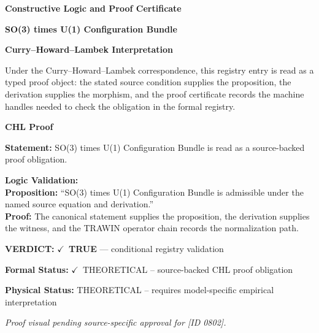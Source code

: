 \clearpage
\begingroup\tzpsupportsetup
\noindent\textbf{\fontsize{10.8pt}{12.8pt}\selectfont [ID 0802] Constructive Logic and Proof Certificate}\par
\noindent\textbf{\fontsize{10pt}{12pt}\selectfont SO(3) times U(1) Configuration Bundle}\par
\vspace{0.45em}
\begingroup
\footnotesize
\setlength{\parskip}{0.22em}
\setlength{\parindent}{0pt}
\noindent\textbf{Curry--Howard--Lambek Interpretation}\par
Under the Curry--Howard--Lambek correspondence, this registry entry is read as a typed proof
object: the stated source condition supplies the proposition, the derivation supplies the
morphism, and the proof certificate records the machine handles needed to check the obligation
in the formal registry.

\vspace{0.45em}
\noindent\textbf{CHL Proof}\par
\textbf{Statement:} SO(3) times U(1) Configuration Bundle is read as a source-backed proof obligation.

\textbf{Logic Validation:}\\
\textbf{Proposition:} ``SO(3) times U(1) Configuration Bundle is admissible under the named source equation and derivation.''\\
\textbf{Proof:} The canonical statement supplies the proposition, the derivation supplies the witness, and the TRAWIN operator chain records the normalization path.

\textbf{VERDICT:} \ensuremath{\checkmark}\ \textbf{TRUE} --- conditional registry validation

\textbf{Formal Status:} \ensuremath{\checkmark}\ THEORETICAL -- source-backed CHL proof obligation

\textbf{Physical Status:} THEORETICAL -- requires model-specific empirical interpretation
\par\vspace{0.45em}
\par
\vfill
\begingroup\footnotesize\itshape
Proof visual pending source-specific approval for [ID 0802].
\par\endgroup
\vfill
\endgroup
\endgroup
